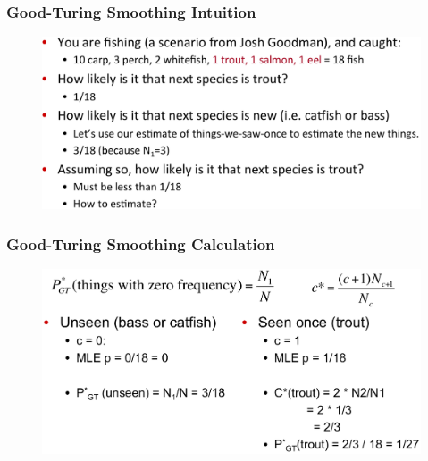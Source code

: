 \documentclass{beamer}
\begin{document}


\begin{frame}\frametitle{Good-Turing Smoothing Intuition}
\begin{figure}
\includegraphics[width=1\linewidth]{figure/good_turing_smoothing.pdf}
\label{fig:good_turing_smoothing}
\end{figure}
\end{frame}


\begin{frame}\frametitle{Good-Turing Smoothing Calculation}
\begin{figure}
\includegraphics[width=0.9\linewidth]{figure/good_turing_calculation.pdf}
\label{fig:good_turing_calculation}
\end{figure}
\end{frame}
\end{document}
